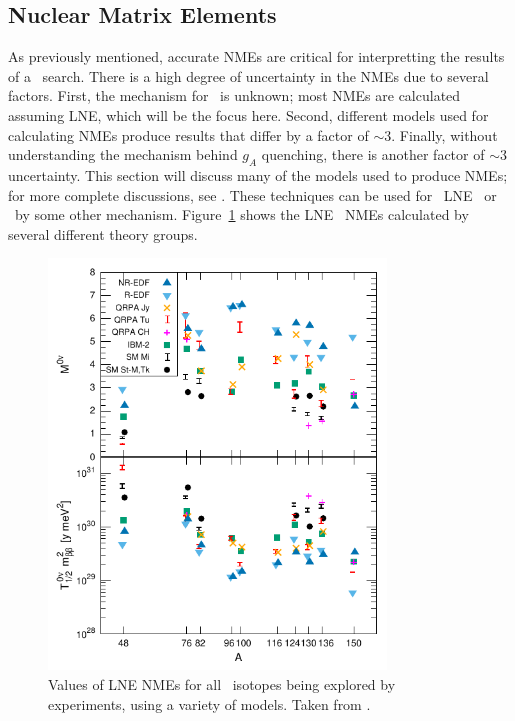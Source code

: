 \documentclass[/main.tex]{subfiles}
\begin{document}
\subsection{Nuclear Matrix Elements} \label{sec:NMEmethods}
As previously mentioned, accurate NMEs are critical for interpretting the results of a \znbb\ search.
There is a high degree of uncertainty in the NMEs due to several factors.
First, the mechanism for \znbb\ is unknown; most NMEs are calculated assuming LNE, which will be the focus here.
Second, different models used for calculating NMEs produce results that differ by a factor of $\sim3$.
Finally, without understanding the mechanism behind $g_A$ quenching, there is another factor of $\sim3$ uncertainty.
This section will discuss many of the models used to produce NMEs; for more complete discussions, see \cite{Avignone2008, Engel2017}.
These techniques can be used for \tnbb\, LNE \znbb\ or \znbb\ by some other mechanism.
Figure~\ref{fig:horribleplot} shows the LNE \znbb\ NMEs calculated by several different theory groups.
\begin{figure}[p]
  \centering
  \includegraphics[width=0.8\textwidth]{horribleplot}
  \caption[\znbb\ Nuclear Matrix Element Calculations]{\label{fig:horribleplot}
    Values of LNE NMEs for all \znbb\ isotopes being explored by experiments, using a variety of models. Taken from \cite{Engel2017}.
  }
\end{figure}
\end{document}
